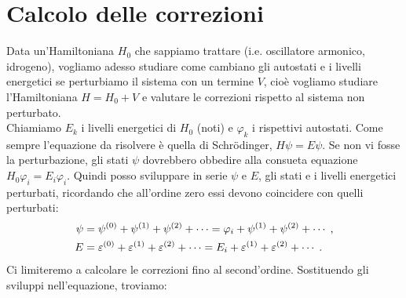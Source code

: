 \documentclass[10pt,a4paper]{report}
\theoremstyle{definition}
\numberwithin{equation}{section}
\newcommand{\Sch}{Schrödinger}
\begin{document}
\section{Calcolo delle correzioni}
Data un'Hamiltoniana $H_0$ che sappiamo trattare (i.e. oscillatore armonico, idrogeno), vogliamo adesso studiare come cambiano gli autostati e i livelli energetici se perturbiamo il sistema con un termine $V$, cioè vogliamo studiare l'Hamiltoniana $H=H_0+V$ e valutare le correzioni rispetto al sistema non perturbato. \\
Chiamiamo $E_k$ i livelli energetici di $H_0$ (noti) e $\varphi_k$ i rispettivi autostati. Come sempre l'equazione da risolvere è quella di \Sch, $H\psi=E\psi$. Se non vi fosse la perturbazione, gli stati $\psi$ dovrebbero obbedire alla consueta equazione $H_0\varphi_i=E_i\varphi_i$. Quindi posso sviluppare in serie $\psi$ e $E$, gli stati e i livelli energetici perturbati, ricordando che all'ordine zero essi devono coincidere con quelli perturbati:
\begin{align}
\psi&=\psi^{(0)}+\psi^{(1)}+\psi^{(2)}+\cdots = \varphi_i+\psi^{(1)}+\psi^{(2)}+\cdots\;, \notag \\
E &= \varepsilon^{(0)}+\varepsilon^{(1)}+\varepsilon^{(2)}+\cdots=E_i+\varepsilon^{(1)}+\varepsilon^{(2)}+\cdots\;.
\end{align} 
Ci limiteremo a calcolare le correzioni fino al second'ordine. Sostituendo gli sviluppi nell'equazione, troviamo:
\end{document}
